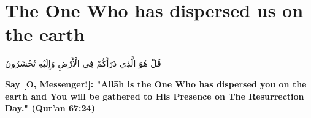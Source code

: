 \chapter{The One Who has dispersed us on the earth}
\begin{center}
    {\Huge    
        \begin{Arabic}
            قُلْ هُوَ الَّذِي ذَرَأَكُمْ فِي الْأَرْضِ وَإِلَيْهِ تُحْشَرُونَ
        \end{Arabic}
    }
\end{center}
\vspace*{\fill}
\vspace{3cm}
\begin{center}
    \large \textbf{Say [O, Messenger!]: "Allāh is the One Who has dispersed you on the earth and You will be gathered to His Presence on The Resurrection Day." (Qur'an 67:24)}
\end{center}
